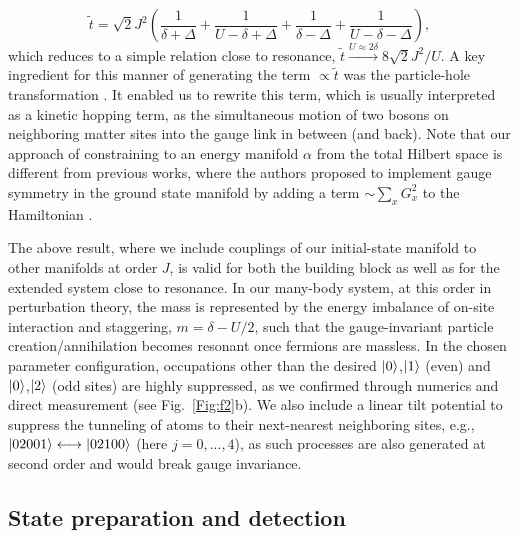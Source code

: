 \documentclass[aps,prl,twocolumn,superscriptaddress,footinbib,linenumbers]{revtex4}
\begin{document}
\begin{equation}
\tilde{t} = \sqrt{2} J^2 \left(\frac{1}{\delta+\Delta} + \frac{1}{U-\delta +\Delta} + \frac{1}{\delta-\Delta} + \frac{1}{U-\delta-\Delta}\right),
\end{equation}
which reduces to a simple relation close to resonance, $\tilde{t} \overset{U\approx2\delta}{\rightarrow} 8\sqrt{2} J^2/U$. A key ingredient for this manner of generating the term $\propto \tilde{t}$ was the particle-hole transformation \cite{Hauke:2013,Yang:2016}. It enabled us to rewrite this term, which is usually interpreted as a kinetic hopping term, as the simultaneous motion of two bosons on neighboring matter sites into the gauge link in between (and back). Note that our approach of constraining to an energy manifold $\alpha$ from the total Hilbert space is different from previous works, where the authors proposed to implement gauge symmetry in the ground state manifold by adding a term $\sim \sum_x G_{x}^2$ to the Hamiltonian \cite{Zohar:2011, Banerjee:2013,Hauke:2013,Halimeh:2020}.

The above result, where we include couplings of our initial-state manifold to other manifolds at order $J$, is valid for both the building block as well as for the extended system close to resonance. In our many-body system, at this order in perturbation theory, the mass is represented by the energy imbalance of on-site interaction and staggering, $m = \delta - U/2$, such that the gauge-invariant particle creation/annihilation becomes resonant once fermions are massless. In the chosen parameter configuration, occupations other than the desired $\ket{0}$,$\ket{1}$ (even) and $\ket{0}$,$\ket{2}$ (odd sites) are highly suppressed, as we confirmed through numerics and direct measurement (see Fig.~\ref{Fig:f2}b). We also include a linear tilt potential to suppress the tunneling of atoms to their next-nearest neighboring sites, e.g., $\ket{02001} \longleftrightarrow \ket{02100}$ (here $j=0,...,4$), as such processes are also generated at second order and would break gauge invariance.

\subsection{State preparation and detection}
\end{document}
